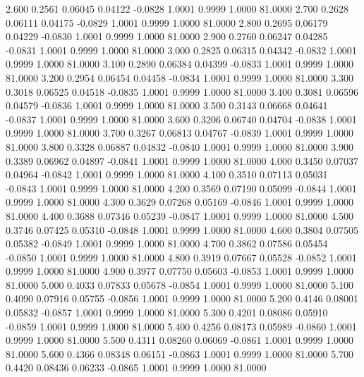    2.600   0.2561   0.06045   0.04122  -0.0828   1.0001   0.9999   1.0000  81.0000
   2.700   0.2628   0.06111   0.04175  -0.0829   1.0001   0.9999   1.0000  81.0000
   2.800   0.2695   0.06179   0.04229  -0.0830   1.0001   0.9999   1.0000  81.0000
   2.900   0.2760   0.06247   0.04285  -0.0831   1.0001   0.9999   1.0000  81.0000
   3.000   0.2825   0.06315   0.04342  -0.0832   1.0001   0.9999   1.0000  81.0000
   3.100   0.2890   0.06384   0.04399  -0.0833   1.0001   0.9999   1.0000  81.0000
   3.200   0.2954   0.06454   0.04458  -0.0834   1.0001   0.9999   1.0000  81.0000
   3.300   0.3018   0.06525   0.04518  -0.0835   1.0001   0.9999   1.0000  81.0000
   3.400   0.3081   0.06596   0.04579  -0.0836   1.0001   0.9999   1.0000  81.0000
   3.500   0.3143   0.06668   0.04641  -0.0837   1.0001   0.9999   1.0000  81.0000
   3.600   0.3206   0.06740   0.04704  -0.0838   1.0001   0.9999   1.0000  81.0000
   3.700   0.3267   0.06813   0.04767  -0.0839   1.0001   0.9999   1.0000  81.0000
   3.800   0.3328   0.06887   0.04832  -0.0840   1.0001   0.9999   1.0000  81.0000
   3.900   0.3389   0.06962   0.04897  -0.0841   1.0001   0.9999   1.0000  81.0000
   4.000   0.3450   0.07037   0.04964  -0.0842   1.0001   0.9999   1.0000  81.0000
   4.100   0.3510   0.07113   0.05031  -0.0843   1.0001   0.9999   1.0000  81.0000
   4.200   0.3569   0.07190   0.05099  -0.0844   1.0001   0.9999   1.0000  81.0000
   4.300   0.3629   0.07268   0.05169  -0.0846   1.0001   0.9999   1.0000  81.0000
   4.400   0.3688   0.07346   0.05239  -0.0847   1.0001   0.9999   1.0000  81.0000
   4.500   0.3746   0.07425   0.05310  -0.0848   1.0001   0.9999   1.0000  81.0000
   4.600   0.3804   0.07505   0.05382  -0.0849   1.0001   0.9999   1.0000  81.0000
   4.700   0.3862   0.07586   0.05454  -0.0850   1.0001   0.9999   1.0000  81.0000
   4.800   0.3919   0.07667   0.05528  -0.0852   1.0001   0.9999   1.0000  81.0000
   4.900   0.3977   0.07750   0.05603  -0.0853   1.0001   0.9999   1.0000  81.0000
   5.000   0.4033   0.07833   0.05678  -0.0854   1.0001   0.9999   1.0000  81.0000
   5.100   0.4090   0.07916   0.05755  -0.0856   1.0001   0.9999   1.0000  81.0000
   5.200   0.4146   0.08001   0.05832  -0.0857   1.0001   0.9999   1.0000  81.0000
   5.300   0.4201   0.08086   0.05910  -0.0859   1.0001   0.9999   1.0000  81.0000
   5.400   0.4256   0.08173   0.05989  -0.0860   1.0001   0.9999   1.0000  81.0000
   5.500   0.4311   0.08260   0.06069  -0.0861   1.0001   0.9999   1.0000  81.0000
   5.600   0.4366   0.08348   0.06151  -0.0863   1.0001   0.9999   1.0000  81.0000
   5.700   0.4420   0.08436   0.06233  -0.0865   1.0001   0.9999   1.0000  81.0000
